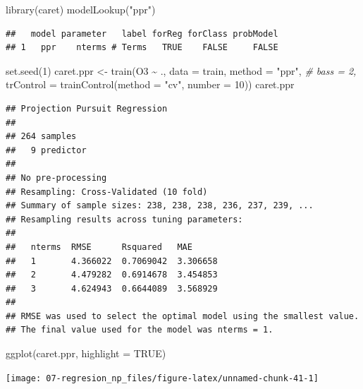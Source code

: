 \documentclass[
]{book}
\newenvironment{Shaded}{\begin{snugshade}}{\end{snugshade}}
\newcommand{\AttributeTok}[1]{\textcolor[rgb]{0.77,0.63,0.00}{#1}}
\newcommand{\CommentTok}[1]{\textcolor[rgb]{0.56,0.35,0.01}{\textit{#1}}}
\newcommand{\ConstantTok}[1]{\textcolor[rgb]{0.00,0.00,0.00}{#1}}
\newcommand{\DecValTok}[1]{\textcolor[rgb]{0.00,0.00,0.81}{#1}}
\newcommand{\FunctionTok}[1]{\textcolor[rgb]{0.00,0.00,0.00}{#1}}
\newcommand{\NormalTok}[1]{#1}
\newcommand{\OtherTok}[1]{\textcolor[rgb]{0.56,0.35,0.01}{#1}}
\newcommand{\SpecialCharTok}[1]{\textcolor[rgb]{0.00,0.00,0.00}{#1}}
\newcommand{\StringTok}[1]{\textcolor[rgb]{0.31,0.60,0.02}{#1}}
\theoremstyle{break}
\theoremstyle{definition}
\theoremstyle{definition}
\theoremstyle{definition}
\theoremstyle{definition}
\theoremstyle{remark}
\begin{document}
\begin{Shaded}
\begin{Highlighting}[]
\FunctionTok{library}\NormalTok{(caret)}
\FunctionTok{modelLookup}\NormalTok{(}\StringTok{"ppr"}\NormalTok{)}
\end{Highlighting}
\end{Shaded}

\begin{verbatim}
##   model parameter   label forReg forClass probModel
## 1   ppr    nterms # Terms   TRUE    FALSE     FALSE
\end{verbatim}

\begin{Shaded}
\begin{Highlighting}[]
\FunctionTok{set.seed}\NormalTok{(}\DecValTok{1}\NormalTok{)}
\NormalTok{caret.ppr }\OtherTok{\textless{}{-}} \FunctionTok{train}\NormalTok{(O3 }\SpecialCharTok{\textasciitilde{}}\NormalTok{ ., }\AttributeTok{data =}\NormalTok{ train, }\AttributeTok{method =} \StringTok{"ppr"}\NormalTok{, }\CommentTok{\# bass = 2,}
    \AttributeTok{trControl =} \FunctionTok{trainControl}\NormalTok{(}\AttributeTok{method =} \StringTok{"cv"}\NormalTok{, }\AttributeTok{number =} \DecValTok{10}\NormalTok{))}
\NormalTok{caret.ppr}
\end{Highlighting}
\end{Shaded}

\begin{verbatim}
## Projection Pursuit Regression 
## 
## 264 samples
##   9 predictor
## 
## No pre-processing
## Resampling: Cross-Validated (10 fold) 
## Summary of sample sizes: 238, 238, 238, 236, 237, 239, ... 
## Resampling results across tuning parameters:
## 
##   nterms  RMSE      Rsquared   MAE     
##   1       4.366022  0.7069042  3.306658
##   2       4.479282  0.6914678  3.454853
##   3       4.624943  0.6644089  3.568929
## 
## RMSE was used to select the optimal model using the smallest value.
## The final value used for the model was nterms = 1.
\end{verbatim}

\begin{Shaded}
\begin{Highlighting}[]
\FunctionTok{ggplot}\NormalTok{(caret.ppr, }\AttributeTok{highlight =} \ConstantTok{TRUE}\NormalTok{)}
\end{Highlighting}
\end{Shaded}

\begin{center}\texttt{[image: 07-regresion\_np\_files/figure-latex/unnamed-chunk-41-1]} \end{center}
\end{document}
